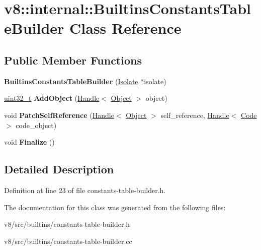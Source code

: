 \hypertarget{classv8_1_1internal_1_1BuiltinsConstantsTableBuilder}{}\section{v8\+:\+:internal\+:\+:Builtins\+Constants\+Table\+Builder Class Reference}
\label{classv8_1_1internal_1_1BuiltinsConstantsTableBuilder}
\subsection*{Public Member Functions}
\begin{DoxyCompactItemize}
\item 
\mbox{\label{classv8_1_1internal_1_1BuiltinsConstantsTableBuilder_a6098141705a17b4a1b8294c492f16bc2}} 
{\bfseries Builtins\+Constants\+Table\+Builder} (\mbox{\hyperlink{classv8_1_1internal_1_1Isolate}{Isolate}} $\ast$isolate)
\item 
\mbox{\label{classv8_1_1internal_1_1BuiltinsConstantsTableBuilder_add6e429287774b8dcb94002ca85cec81}} 
\mbox{\hyperlink{classuint32__t}{uint32\+\_\+t}} {\bfseries Add\+Object} (\mbox{\hyperlink{classv8_1_1internal_1_1Handle}{Handle}}$<$ \mbox{\hyperlink{classv8_1_1internal_1_1Object}{Object}} $>$ object)
\item 
\mbox{\label{classv8_1_1internal_1_1BuiltinsConstantsTableBuilder_ade6be7e8304f96892281c061f1426c9b}} 
void {\bfseries Patch\+Self\+Reference} (\mbox{\hyperlink{classv8_1_1internal_1_1Handle}{Handle}}$<$ \mbox{\hyperlink{classv8_1_1internal_1_1Object}{Object}} $>$ self\+\_\+reference, \mbox{\hyperlink{classv8_1_1internal_1_1Handle}{Handle}}$<$ \mbox{\hyperlink{classv8_1_1internal_1_1Code}{Code}} $>$ code\+\_\+object)
\item 
\mbox{\label{classv8_1_1internal_1_1BuiltinsConstantsTableBuilder_a76ab99641e2d859b92e8dcc91516a9e6}} 
void {\bfseries Finalize} ()
\end{DoxyCompactItemize}


\subsection{Detailed Description}


Definition at line 23 of file constants-\/table-\/builder.\+h.



The documentation for this class was generated from the following files\+:\begin{DoxyCompactItemize}
\item 
v8/src/builtins/constants-\/table-\/builder.\+h\item 
v8/src/builtins/constants-\/table-\/builder.\+cc\end{DoxyCompactItemize}
